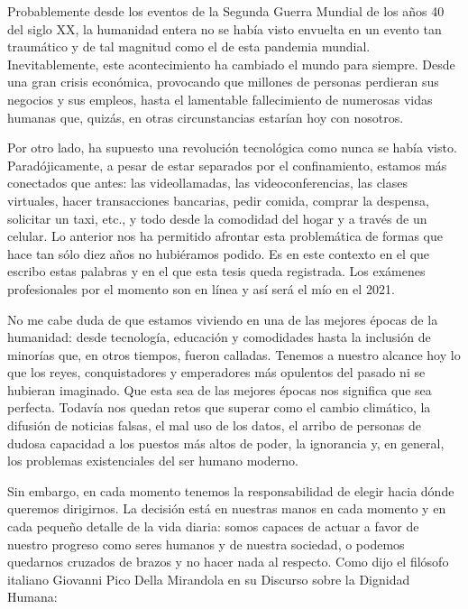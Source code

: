 Probablemente desde los eventos de la Segunda Guerra Mundial de los años 40 del siglo XX, la humanidad entera no se había visto envuelta en un evento tan traumático y de tal magnitud como el de esta pandemia mundial.  Inevitablemente, este acontecimiento ha cambiado el mundo para siempre. Desde una gran crisis económica, provocando que millones de personas perdieran sus negocios y sus empleos, hasta el lamentable fallecimiento de numerosas vidas humanas que, quizás, en otras circunstancias estarían hoy con nosotros. 


Por otro lado, ha supuesto una revolución tecnológica como nunca se había visto. Paradójicamente, a pesar de estar separados por el confinamiento, estamos más conectados que antes: las videollamadas, las videoconferencias, las clases virtuales, hacer transacciones bancarias, pedir comida, comprar la despensa, solicitar un taxi, etc., y todo desde la comodidad del hogar y a través de un celular. Lo anterior nos ha permitido afrontar esta problemática de formas que hace tan sólo diez años no hubiéramos podido. Es en este contexto en el que escribo estas palabras y en el que esta tesis queda registrada. Los exámenes profesionales por el momento son en línea y así será el mío en el 2021.


No me cabe duda de que estamos viviendo en una de las mejores épocas de la humanidad: desde tecnología, educación y comodidades hasta la inclusión de minorías que, en otros tiempos, fueron calladas. Tenemos a nuestro alcance hoy lo que los reyes, conquistadores y emperadores más opulentos del pasado ni se hubieran imaginado. Que esta sea de las mejores épocas nos significa que sea perfecta. Todavía nos quedan retos que superar como el cambio climático, la difusión de noticias falsas, el mal uso de los datos, el arribo de personas de dudosa capacidad a los puestos más altos de poder, la ignorancia y, en general, los problemas existenciales del ser humano moderno.

Sin embargo, en cada momento tenemos la responsabilidad de elegir hacia dónde queremos dirigirnos. La decisión está en nuestras manos en cada momento y en cada pequeño detalle de la vida diaria: somos capaces de actuar a favor de nuestro progreso como seres humanos y de nuestra sociedad, o podemos quedarnos cruzados de brazos y no hacer nada al respecto. Como dijo el filósofo italiano Giovanni Pico Della Mirandola en su Discurso sobre la Dignidad Humana:

